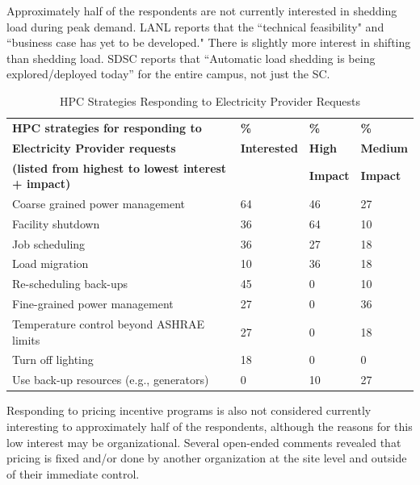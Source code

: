 Approximately half of the respondents are not currently interested in shedding
load during peak demand. LANL reports that the ``technical feasibility" and ``business case has yet to be developed."
There is slightly more interest in shifting than shedding load. SDSC reports that
 ``Automatic load shedding is being explored/deployed today'' for the entire campus, not just the SC.

\begin{table}[htbp]
\centering
\caption{HPC Strategies Responding to Electricity Provider Requests}
\begin{tabular}{|p{2.5in}|p{0.75in}|p{0.75in}|p{0.75in}|} \hline

\textbf{HPC strategies for responding to} &
\textbf{\%} &
\textbf{\%} &
\textbf{\%} \\

\textbf{Electricity Provider requests} &
\textbf{Interested} &
\textbf{High} &
\textbf{Medium} \\

\textbf{(listed from highest to lowest interest + impact)} &
 &
\textbf{Impact} & 
\textbf{Impact} \\
\hline

Coarse grained power management &
64 &
46 &
27 \\
\hline

Facility shutdown&
36 &
64 &
10 \\
\hline

Job scheduling&
36 &
27 &
18 \\
\hline

Load migration &
10 &
36 &
18 \\
\hline

Re-scheduling back-ups &
45 &
0 &
10 \\
\hline

Fine-grained power management &
27 &
0 &
36 \\
\hline

Temperature control beyond ASHRAE limits &
27 &
0 &
18 \\
\hline

Turn off lighting &
18 &
0 &
0 \\
\hline

Use back-up resources (e.g., generators) &
0 &
10 &
27 \\
\hline

\end{tabular}
\label{tab3}
\end{table}
Responding to pricing incentive programs is also not considered currently interesting to approximately half of the respondents, although the reasons for this low interest may be organizational. Several
open-ended comments revealed that pricing is fixed and/or done by another
organization at the site level and outside of their immediate control.


